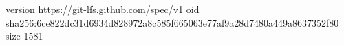 version https://git-lfs.github.com/spec/v1
oid sha256:6ce822dc31d6934d828972a8c585f665063e77af9a28d7480a449a8637352f80
size 1581
